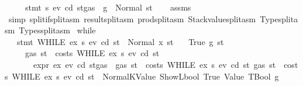 \begin{isabellebody}
\ \ \ \ \ {\isachardoublequoteopen}stmt\ s{}\ ev\ cd\ {\isacharparenleft}{\kern0pt}st{\isasymlparr}gas\ {\isacharcolon}{\kern0pt}{\isacharequal}{\kern0pt}\ g{\isasymrparr}{\isacharparenright}{\kern0pt}\ {\isacharequal}{\kern0pt}\ Normal{\isacharparenleft}{\kern0pt}{\isacharparenleft}{\kern0pt}{\isacharparenright}{\kern0pt}{\isacharcomma}{\kern0pt}\ st{\isacharprime}{\kern0pt}{\isacharparenright}{\kern0pt}{\isachardoublequoteclose}\isanewline
%
\isadelimproof
\ \ %
\endisadelimproof
%
\isatagproof
{}\isamarkupfalse%
\ assms\ \isamarkupfalse%
\ {\isacharparenleft}{\kern0pt}simp\ split{\isacharcolon}{\kern0pt}if{\isacharunderscore}{\kern0pt}split{\isacharunderscore}{\kern0pt}asm\ result{\isachardot}{\kern0pt}split{\isacharunderscore}{\kern0pt}asm\ prod{\isachardot}{\kern0pt}split{\isacharunderscore}{\kern0pt}asm\ Stackvalue{\isachardot}{\kern0pt}split{\isacharunderscore}{\kern0pt}asm\ Type{\isachardot}{\kern0pt}split{\isacharunderscore}{\kern0pt}asm\ Types{\isachardot}{\kern0pt}split{\isacharunderscore}{\kern0pt}asm{\isacharparenright}{\kern0pt}%
\endisatagproof
{\isafoldproof}%
%
\isadelimproof
\isanewline
%
\endisadelimproof
\isanewline
{}\isamarkupfalse%
\ while{\isacharcolon}{\kern0pt}\ \ \ \ \ \ \ \ \ \ \ \isanewline
\ \ \ {\isachardoublequoteopen}stmt\ {\isacharparenleft}{\kern0pt}WHILE\ ex\ s{}{\isacharparenright}{\kern0pt}\ ev\ cd\ st\ {\isacharequal}{\kern0pt}\ Normal\ {\isacharparenleft}{\kern0pt}x{\isacharcomma}{\kern0pt}\ st{\isacharprime}{\kern0pt}{\isacharparenright}{\kern0pt}{\isachardoublequoteclose}\isanewline
\ \ \ {\isacharparenleft}{\kern0pt}True{\isacharparenright}{\kern0pt}\ g\ st{\isacharprime}{\kern0pt}{\isacharprime}{\kern0pt}\isanewline
\ \ \ \ \ {\isachardoublequoteopen}gas\ st\ {\isachargreater}{\kern0pt}\ costs\ {\isacharparenleft}{\kern0pt}WHILE\ ex\ s{}{\isacharparenright}{\kern0pt}\ ev\ cd\ st{\isachardoublequoteclose}\isanewline
\ \ \ \ \ \ \ {\isachardoublequoteopen}expr\ ex\ ev\ cd\ {\isacharparenleft}{\kern0pt}st{\isasymlparr}gas\ {\isacharcolon}{\kern0pt}{\isacharequal}{\kern0pt}\ gas\ st\ {\isacharminus}{\kern0pt}\ costs\ {\isacharparenleft}{\kern0pt}WHILE\ ex\ s{}{\isacharparenright}{\kern0pt}\ ev\ cd\ st{\isasymrparr}{\isacharparenright}{\kern0pt}\ {\isacharparenleft}{\kern0pt}gas\ st\ {\isacharminus}{\kern0pt}\ costs\ {\isacharparenleft}{\kern0pt}WHILE\ ex\ s{}{\isacharparenright}{\kern0pt}\ ev\ cd\ st{\isacharparenright}{\kern0pt}\ {\isacharequal}{\kern0pt}\ Normal{\isacharparenleft}{\kern0pt}{\isacharparenleft}{\kern0pt}KValue\ {\isacharparenleft}{\kern0pt}ShowL\isactrlsub b\isactrlsub o\isactrlsub o\isactrlsub l\ True{\isacharparenright}{\kern0pt}{\isacharcomma}{\kern0pt}\ Value\ TBool{\isacharparenright}{\kern0pt}{\isacharcomma}{\kern0pt}\ g{\isacharparenright}{\kern0pt}{\isachardoublequoteclose}\isanewline

\end{isabellebody}
